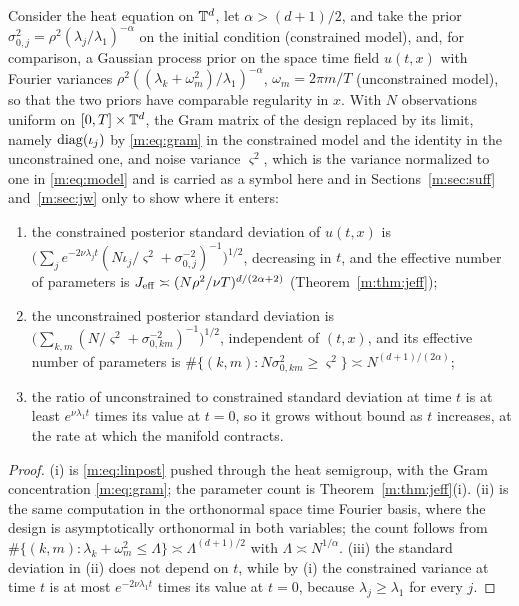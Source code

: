 \begin{proposition}\label{m:prop:gain}
Consider the heat equation on $\mathbb{T}^d$, let $\alpha>(d+1)/2$, and take the prior $\sigma_{0,j}^2=\rho^2(\lambda_j/\lambda_1)^{-\alpha}$ on the initial condition (constrained model), and, for comparison, a Gaussian process prior on the space time field $u(t,x)$ with Fourier variances $\rho^2((\lambda_k+\omega_m^2)/\lambda_1)^{-\alpha}$, $\omega_m=2\pi m/T$ (unconstrained model), so that the two priors have comparable regularity in $x$. With $N$ observations uniform on $[0,T]\times\mathbb{T}^d$, the Gram matrix of the design replaced by its limit, namely $\operatorname{diag}(\iota_j)$ by \eqref{m:eq:gram} in the constrained model and the identity in the unconstrained one, and noise variance $\varsigma^2$, which is the variance normalized to one in \eqref{m:eq:model} and is carried as a symbol here and in Sections~\ref{m:sec:suff} and~\ref{m:sec:jw} only to show where it enters:
\begin{enumerate}[label=(\roman*)]
\item the constrained posterior standard deviation of $u(t,x)$ is $\big(\sum_je^{-2\nu\lambda_jt}(N\iota_j/\varsigma^2+\sigma_{0,j}^{-2})^{-1}\big)^{1/2}$, decreasing in $t$, and the effective number of parameters is $J_{\rm eff}\asymp(N\rho^2/\nu T)^{d/(2\alpha+2)}$ (Theorem~\ref{m:thm:jeff});
\item the unconstrained posterior standard deviation is $\big(\sum_{k,m}(N/\varsigma^2+\sigma_{0,km}^{-2})^{-1}\big)^{1/2}$, independent of $(t,x)$, and its effective number of parameters is $\#\{(k,m):N\sigma^2_{0,km}\ge\varsigma^2\}\asymp N^{(d+1)/(2\alpha)}$;
\item the ratio of unconstrained to constrained standard deviation at time $t$ is at least $e^{\nu\lambda_1t}$ times its value at $t=0$, so it grows without bound as $t$ increases, at the rate at which the manifold contracts.
\end{enumerate}
\end{proposition}

\begin{proof}
(i) is \eqref{m:eq:linpost} pushed through the heat semigroup, with the Gram concentration \eqref{m:eq:gram}; the parameter count is Theorem~\ref{m:thm:jeff}(i). (ii) is the same computation in the orthonormal space time Fourier basis, where the design is asymptotically orthonormal in both variables; the count follows from $\#\{(k,m):\lambda_k+\omega_m^2\le\Lambda\}\asymp\Lambda^{(d+1)/2}$ with $\Lambda\asymp N^{1/\alpha}$. (iii) the standard deviation in (ii) does not depend on $t$, while by (i) the constrained variance at time $t$ is at most $e^{-2\nu\lambda_1t}$ times its value at $t=0$, because $\lambda_j\ge\lambda_1$ for every $j$.
\end{proof}

